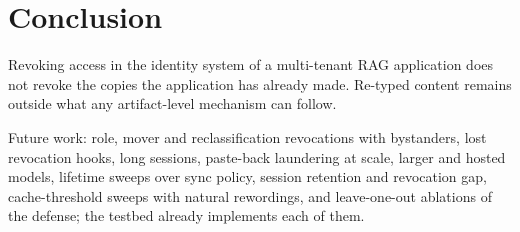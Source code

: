 \section{Conclusion}
\label{sec:conclusion}

Revoking access in the identity system of a multi-tenant RAG application does not revoke the copies
the application has already made.  Re-typed content
remains outside what any artifact-level mechanism can follow.

Future work: role, mover and reclassification revocations with bystanders, lost revocation hooks, long
sessions, paste-back laundering at scale, larger and hosted models, lifetime sweeps over sync policy,
session retention and revocation gap, cache-threshold sweeps with natural rewordings, and
leave-one-out ablations of the defense; the testbed already implements each of them.
